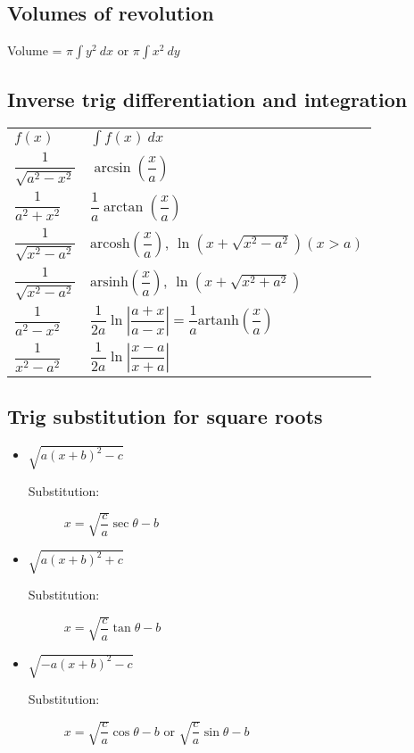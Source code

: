 \subsection{Volumes of revolution}
Volume = $\pi\int y^2 \: dx$ or $\pi\int x^2 \: dy$

\subsection{Inverse trig differentiation and integration}
\begin{tabular}{ll}
	$f(x)$ & $\int f(x) \: dx$\\
	$\dfrac{1}{\sqrt{a^2-x^2}}$ & $\arcsin(\dfrac{x}{a})$\\
	$\dfrac{1}{a^2+x^2}$ & $\dfrac{1}{a}\arctan(\dfrac{x}{a})$\\
	$\dfrac{1}{\sqrt{x^2-a^2}}$ & $\text{arcosh}(\dfrac{x}{a})$, $\ln(x+\sqrt{x^2-a^2}) (x>a)$\\
	$\dfrac{1}{\sqrt{x^2-a^2}}$ & $\text{arsinh}(\dfrac{x}{a})$, $\ln(x+\sqrt{x^2+a^2})$\\
	$\dfrac{1}{a^2-x^2}$ & $\dfrac{1}{2a}\ln |\dfrac{a+x}{a-x}| = \dfrac{1}{a}\text{artanh}(\dfrac{x}{a})$\\
	$\dfrac{1}{x^2-a^2}$ & $\dfrac{1}{2a}\ln |\dfrac{x-a}{x+a}|$\\
\end{tabular}

\subsection{Trig substitution for square roots}
\begin{itemize}
	\item $\sqrt{a(x+b)^2-c}$
	\begin{description}
		\item[Substitution:] $x = \sqrt{\dfrac{c}{a}}\sec\theta - b$
	\end{description}
	\item $\sqrt{a(x+b)^2+c}$
	\begin{description}
		\item[Substitution:] $x = \sqrt{\dfrac{c}{a}}\tan\theta - b$
	\end{description}
	\item $\sqrt{-a(x+b)^2-c}$
	\begin{description}
		\item[Substitution:] $x = \sqrt{\dfrac{c}{a}}\cos\theta - b$ or $\sqrt{\dfrac{c}{a}}\sin\theta - b$
	\end{description}
	
\end{itemize}